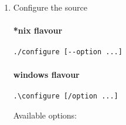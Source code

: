 \begin{enumerate}
\item Configure the source

\paragraph{*nix flavour}
\begin{lstlisting}
./configure [--option ...]
\end{lstlisting}

\paragraph{windows flavour}

\begin{lstlisting}
.\configure [/option ...]
\end{lstlisting}

Available options:


\end{enumerate}
